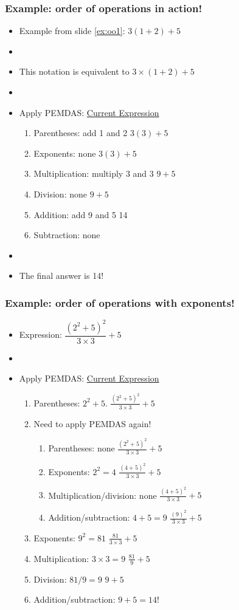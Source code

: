 \documentclass[11pt]{beamer}
\newcommand{\myframe}[1]{\begin{frame} \frametitle{#1}}
\begin{document}
\myframe{Example: order of operations in action!}
\begin{itemize}
\item Example from slide \ref{ex:oo1}: $3(1 + 2) + 5$
\item[]
\item This notation is equivalent to $3\times (1+2) + 5$
\item[]
\item Apply PEMDAS: \hfill \underline{Current Expression}
\begin{enumerate}
\item Parentheses: add 1 and 2 \hfill $3(3) + 5$
\item Exponents: none \hfill $3(3) + 5$
\item Multiplication: multiply 3 and 3 \hfill $9 + 5$
\item Division: none \hfill $9 + 5$
\item Addition: add 9 and 5 \hfill 14
\item Subtraction: none
\end{enumerate}
\item[]
\item The final answer is 14!
\end{itemize}
\end{frame}

\myframe{Example: order of operations with exponents!}
\begin{itemize}
\item Expression: $\dfrac{(2^2 + 5)^2}{3\times 3} + 5$
\item[]
\item Apply PEMDAS: \hfill \underline{Current Expression}
\begin{enumerate}
\item Parentheses: $2^2 + 5$. \hfill $\frac{(2^2 + 5)^2}{3\times 3} + 5$
\item[] Need to apply PEMDAS again!
\begin{enumerate}
\item Parentheses: none \hfill $\frac{(2^2 + 5)^2}{3\times 3} + 5$
\item Exponents: $2^2 = 4$ \hfill $\frac{(4 + 5)^2}{3\times 3} + 5$
\item Multiplication/division: none \hfill $\frac{(4 + 5)^2}{3\times 3} + 5$
\item Addition/subtraction: $4 + 5 = 9$ \hfill $\frac{(9)^2}{3\times 3} + 5$
\end{enumerate}
\item Exponents: $9^2 = 81$ \hfill $\frac{81}{3\times 3} + 5$
\item Multiplication: $3 \times 3 = 9$ \hfill $\frac{81}{9} + 5$
\item Division: $81/9 = 9$ \hfill $9 + 5$
\item Addition/subtraction: $9 + 5 = 14$!
\end{enumerate}
\end{itemize}
\end{frame}
\end{document}
